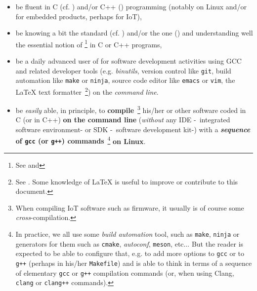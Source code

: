 \begin{itemize}

  \item be fluent in C (cf. \cite{Kernighan:1988:CPL}) and/or C++
    (\cite{Stroustrup:2014:CplusPlus}) programming (notably on Linux
    and/or for embedded products, perhaps for IoT),

  \item be knowing a bit the  standard
    (cf. \cite{C11:std,Memarian:2016:PLDI}) and/or the
     one (\cite{CplusPlus11:std}) and
    understanding well the essential notion of  \footnote{See
      and } in C or C++
    programs,

  \item be a daily advanced user of  for software
    development activities using GCC and related developer tools
    (e.g. \textit{binutils}, version control like \texttt{git}, build
    automation like \texttt{make} or \texttt{ninja}, source code
    editor like \texttt{emacs} or \texttt{vim}, the {\LaTeX} text
    formatter~\footnote{See
      . Some knowledge of
            {\LaTeX} is useful to improve or contribute to this
            document.}) on the \emph{command line}.
    
    \item be \emph{easily} able, in principle, to
      \textbf{compile}~\footnote{When compiling IoT software such as
        firmware, it usually is of course some
        \emph{cross}-compilation.}  his/her or other software coded in
      C (or in C++) \textbf{on the command line} (\emph{without} any
      IDE
      -~integrated software
      environment- or  SDK
      -~software development kit-)
      with a \textbf{\emph{sequence} of \texttt{gcc} (or \texttt{g++})
        commands}~\footnote{In practice, we all use some \emph{build
          automation} tool, such as \texttt{make}, \texttt{ninja} or
        generators for them such as \texttt{cmake}, \emph{autoconf},
        \texttt{meson}, etc... But the reader is expected to be able
        to configure that, e.g. to add more options to \texttt{gcc} or
        to \texttt{g++} (perhaps in his/her \texttt{Makefile}) and is
        able to think in terms of a sequence of elementary
        \texttt{gcc} or \texttt{g++} compilation commands (or, when
        using Clang, \texttt{clang} or \texttt{clang++} commands).}
      \textbf{on Linux}.




\end{itemize}
